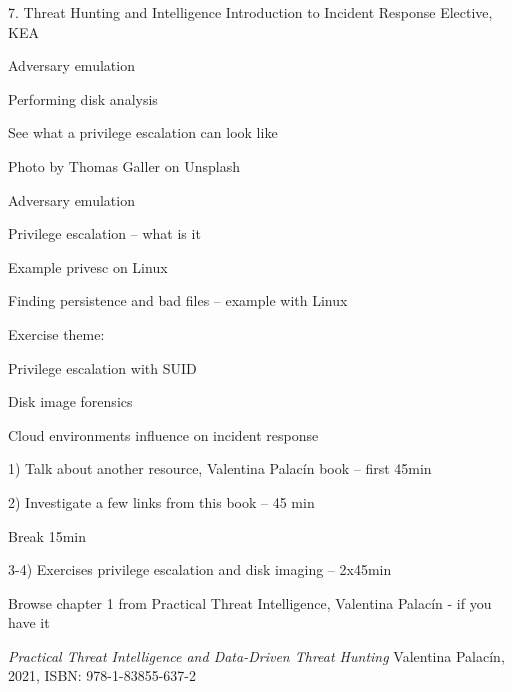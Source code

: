 \documentclass[Screen16to9,17pt]{foils}
\begin{document}
\mytitlepage
{7. Threat Hunting and Intelligence}
{Introduction to Incident Response Elective, KEA}




\begin{list2}
\item Adversary emulation
\item Performing disk analysis
\item See what a privilege escalation can look like
\end{list2}

{\hfill \small Photo by Thomas Galler on Unsplash}


\begin{list2}
\item Adversary emulation
\item Privilege escalation -- what is it
\item Example privesc on Linux
\item Finding persistence and bad files -- example with Linux
\end{list2}

Exercise theme:
\begin{list2}
\item Privilege escalation with SUID
\item Disk image forensics
\item Cloud environments influence on incident response
\end{list2}


\begin{list2}
\item 1) Talk about another resource, Valentina Palacín book  -- first 45min
\item 2) Investigate a few links from this book -- 45 min
\item Break 15min
\item 3-4) Exercises privilege escalation and disk imaging -- 2x45min
\end{list2}





Browse chapter 1 from Practical Threat Intelligence, Valentina Palacín - if you have it

\emph{Practical Threat Intelligence and Data-Driven Threat Hunting}
Valentina Palacín, 2021, ISBN: 978-1-83855-637-2
\end{document}
